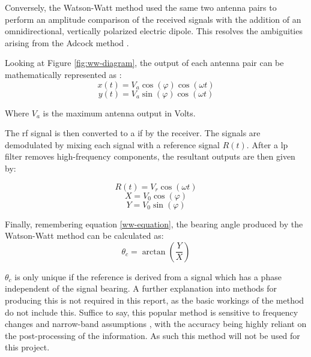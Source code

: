 \documentclass[class=report,11pt,crop=false]{standalone}
\begin{document}
Conversely, the Watson-Watt method used the same two antenna pairs to perform an amplitude comparison of the received signals with the addition of an omnidirectional, vertically polarized electric dipole. This resolves the ambiguities arising from the Adcock method \cite{ww-patent}.

Looking at Figure \ref{fig:ww-diagram}, the output of each antenna pair can be mathematically represented as \cite{ww-diagram}:
\begin{equation}
    x(t) = V_a \cos(\varphi) \cos(\omega t)
\end{equation}
\begin{equation}
    y(t) = V_a \sin(\varphi) \cos(\omega t)
\end{equation}

Where $V_a$ is the maximum antenna output in Volts.

The \gls{rf} signal is then converted to a \gls{if} by the receiver. The signals are demodulated by mixing each signal with a reference signal $R(t)$. After a \gls{lp} filter removes high-frequency components, the resultant outputs are then given by:

\begin{equation}
    R(t) = V_r \cos(\omega t)
\end{equation}
\begin{equation}
    X = V_0 \cos(\varphi)
\end{equation}
\begin{equation}
    Y = V_0 \sin(\varphi) 
\end{equation}

Finally, remembering equation \ref{ww-equation}, the bearing angle produced by the Watson-Watt method can be calculated as:
\begin{equation}
    \theta_c = \arctan(\frac{Y}{X})
\end{equation}

$\theta_c$ is only unique if the reference is derived from a signal which has a phase independent of the signal bearing. A further explanation into methods for producing this is not required in this report, as the basic workings of the method do not include this. Suffice to say, this popular method is sensitive to frequency changes and narrow-band assumptions \cite{df-issues}, with the accuracy being highly reliant on the post-processing of the information. As such this method will not be used for this project. 
\end{document}

